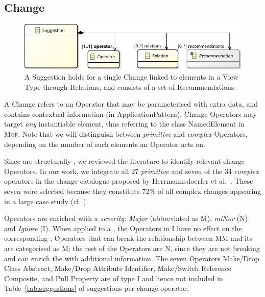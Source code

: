 \subsection{Change}
\label{sec:Suggestion:Change}

\begin{figure}[t]
    \centering
    \includegraphics[width=\columnwidth]{images/Suggestion.pdf}
    \caption{A \textsf{Suggestion} holds for a single \textsf{Change} linked to 
		elements in a View Type through \textsf{Relation}s, and consists of a set of \textsf{Recommendation}s.}
    \label{fig:Suggestion}
\end{figure}

A \textsf{Change} refers to an \textsf{Operator} that may be parameterised with 
extra data, and contains contextual information (in \textsf{ApplicationPattern}). 
Change \textsf{Operator}s may target \emph{any} instantiable \metamodel element, 
thus referring to the class \textsf{NamedElement} in \textsc{Mof}. Note that we 
will distinguish between \emph{primitive} and \emph{complex} \textsf{Operator}s,
depending on the number of such \metamodel elements an \textsf{Operator} acts on.

Since \viewtypes are structurally \metamodels, we reviewed the literature to
identify relevant change \textsf{Operator}s. In our work, we integrate all 27 \textit{primitive} and seven of the 34 \textit{complex} operators in the change catalogue proposed by Herrmannsdoerfer et al.~\cite{herrmannsdoerfer_extensive_2011}.
These seven were selected because they constitute 72\% of all complex changes appearing in a large case study (cf. \cite{khelladi_detecting_2015}). 

\textsf{Operator}s are enriched with a \emph{severity}: \emph{Major}
(abbreviated as \textsf{M}), \emph{miNor} (\textsf{N}) and \emph{Ignore} 
(\textsf{I}). 
When applied to a \metamodel, the \textsf{Operator}s in \textsf{I} have no effect
on the corresponding \viewtypes; \textsf{Operator}s that can break the relationship
between \textsf{MM }and its \viewtypes are categorised as \textsf{M}; the rest of the
\textsf{Operator}s are \textsf{N}, since they are not breaking and can enrich 
the \viewtypes with additional information. The seven \textsf{Operator}s \textsf{Make/Drop Class Abstract}, \textsf{Make/Drop Attribute Identifier}, \textsf{Make/Switch Reference Composite}, and \textsf{Pull Property} are of type \textsf{I} and hence not included in Table~\ref{tab:suggestions} of suggestions per change operator.

